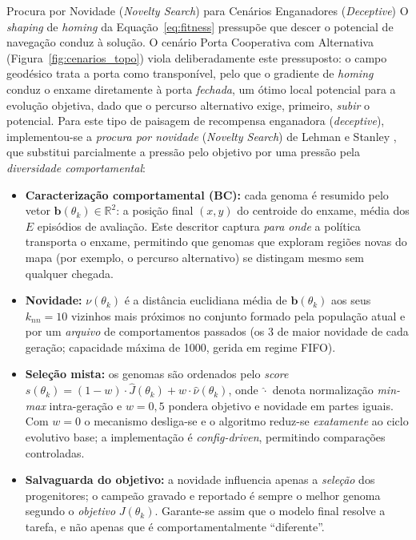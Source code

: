 \documentclass[12pt,reqno, twoside]{amsbook}
\makeatletter
\def\subsection{\@startsection{subsection}{2}%
      \z@{.5\linespacing\@plus.7\linespacing}{.25\linespacing}%
      {\normalfont\bfseries\flushleft}}
\theoremstyle{plain}
\numberwithin{equation}{chapter}
\numberwithin{section}{chapter}
\numberwithin{table}{chapter}
\numberwithin{figure}{chapter}
\makeatother
\begin{document}
\subsection{Procura por Novidade (\textit{Novelty Search}) para Cenários Enganadores (\textit{Deceptive})}
\label{sec:novelty_method}
O \textit{shaping} de \textit{homing} da Equação~\ref{eq:fitness} pressupõe que descer o potencial de navegação conduz à solução. O cenário Porta Cooperativa com Alternativa (Figura~\ref{fig:cenarios_topo}) viola deliberadamente este pressuposto: o campo geodésico trata a porta como transponível, pelo que o gradiente de \textit{homing} conduz o enxame diretamente à porta \emph{fechada}, um ótimo local potencial para a evolução objetiva, dado que o percurso alternativo exige, primeiro, \emph{subir} o potencial. Para este tipo de paisagem de recompensa enganadora (\textit{deceptive}), implementou-se a \emph{procura por novidade} (\textit{Novelty Search}) de Lehman e Stanley \cite{lehman2011abandoning}, que substitui parcialmente a pressão pelo objetivo por uma pressão pela \emph{diversidade comportamental}:

\begin{itemize}
    \item \textbf{Caracterização comportamental (BC):} cada genoma é resumido pelo vetor $\mathbf{b}(\theta_k) \in \mathbb{R}^2$: a posição final $(x, y)$ do centroide do enxame, média dos $E$ episódios de avaliação. Este descritor captura \emph{para onde} a política transporta o enxame, permitindo que genomas que exploram regiões novas do mapa (por exemplo, o percurso alternativo) se distingam mesmo sem qualquer chegada.
    \item \textbf{Novidade:} $\nu(\theta_k)$ é a distância euclidiana média de $\mathbf{b}(\theta_k)$ aos seus $k_{nn}=10$ vizinhos mais próximos no conjunto formado pela população atual e por um \emph{arquivo} de comportamentos passados (os 3 de maior novidade de cada geração; capacidade máxima de 1000, gerida em regime FIFO).
    \item \textbf{Seleção mista:} os genomas são ordenados pelo \textit{score} $s(\theta_k) = (1-w)\cdot\widehat{J}(\theta_k) + w\cdot\widehat{\nu}(\theta_k)$, onde $\widehat{\cdot}$ denota normalização \textit{min-max} intra-geração e $w=0{,}5$ pondera objetivo e novidade em partes iguais. Com $w=0$ o mecanismo desliga-se e o algoritmo reduz-se \emph{exatamente} ao ciclo evolutivo base; a implementação é \textit{config-driven}, permitindo comparações controladas.
    \item \textbf{Salvaguarda do objetivo:} a novidade influencia apenas a \emph{seleção} dos progenitores; o campeão gravado e reportado é sempre o melhor genoma segundo o \emph{objetivo} $J(\theta_k)$. Garante-se assim que o modelo final resolve a tarefa, e não apenas que é comportamentalmente ``diferente''.
\end{itemize}
\end{document}
